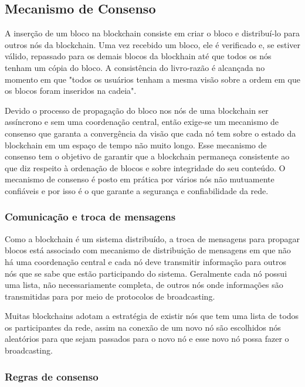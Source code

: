 \documentclass[12pt]{article}
\begin{document}
\subsection{Mecanismo de Consenso}

A inserção de um bloco na blockchain consiste em criar o bloco e distribuí-lo para outros nós da blockchain. Uma vez recebido um bloco, ele é verificado e, se estiver válido, repassado para os demais blocos da blockhain até que todos os nós tenham um cópia do bloco. A consistência do livro-razão é alcançada no momento em que "todos os usuários tenham a mesma visão sobre a ordem em que os blocos foram inseridos na cadeia"\cite{miers2019analise}.

Devido o processo de propagação do bloco nos nós de uma blockchain ser assíncrono e sem uma coordenação central, então exige-se um mecanismo de consenso que garanta a convergência da visão que cada nó tem sobre o estado da blockchain em um espaço de tempo não muito longo. Esse mecanismo de consenso tem o objetivo de garantir que a blockchain permaneça consistente ao que diz respeito à ordenação de blocos e sobre integridade do seu conteúdo. O mecanismo de consenso é posto em prática por vários nós não mutuamente confiáveis e por isso é o que garante a segurança e confiabilidade da rede.

\subsubsection{Comunicação e troca de mensagens}

Como a blockchain é um sistema distribuído, a troca de mensagens para propagar blocos está associado com mecanismo de distribuição de mensagens em que não há uma coordenação central e cada nó deve transmitir informação para outros nós que se sabe que estão participando do sistema. Geralmente cada nó possui uma lista, não necessariamente completa, de outros nós onde informações são transmitidas para por meio de protocolos de broadcasting\cite{miers2019analise}.

Muitas blockchains adotam a estratégia de existir nós que tem uma lista de todos os participantes da rede, assim na conexão de um novo nó são escolhidos nós aleatórios para que sejam passados para o novo nó e esse novo nó possa fazer o broadcasting.

\subsubsection{Regras de consenso}
\end{document}
